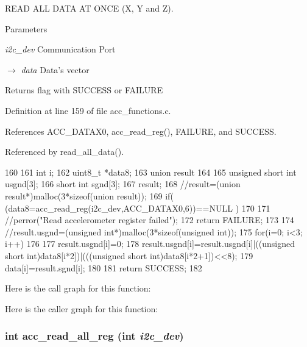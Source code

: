 READ ALL DATA AT ONCE (X, Y and Z). 


\begin{DoxyParams}{Parameters}
\item[{\em i2c\_\-dev}]Communication Port \item[\mbox{$\rightarrow$} {\em data}]Data's vector\end{DoxyParams}
\begin{DoxyReturn}{Returns}
flag with SUCCESS or FAILURE 
\end{DoxyReturn}


Definition at line 159 of file acc\_\-functions.c.



References ACC\_\-DATAX0, acc\_\-read\_\-reg(), FAILURE, and SUCCESS.



Referenced by read\_\-all\_\-data().




\begin{DoxyCode}
160 {
161   int i;
162   uint8_t *data8;
163   union result
164   {
165     unsigned short int usgnd[3];
166     short int sgnd[3];
167   } result;
168   //result=(union result*)malloc(3*sizeof(union result));
169   if( (data8=acc_read_reg(i2c_dev,ACC_DATAX0,6))==NULL )
170   {
171     //perror("Read accelerometer register failed");
172     return FAILURE;
173   }
174   //result.usgnd=(unsigned int*)malloc(3*sizeof(unsigned int));
175   for(i=0; i<3; i++)
176   {
177     result.usgnd[i]=0;
178     result.usgnd[i]=result.usgnd[i]|((unsigned short int)data8[i*2])|(((unsigned 
      short int)data8[i*2+1])<<8);
179     data[i]=result.sgnd[i];
180   }
181   return SUCCESS;  
182 }
\end{DoxyCode}




Here is the call graph for this function:



Here is the caller graph for this function:

\hypertarget{group__acc_ga8509cccabb08e7267677f66f25718731}{
\subsubsection[{acc\_\-read\_\-all\_\-reg}]{\setlength{\rightskip}{0pt plus 5cm}int acc\_\-read\_\-all\_\-reg (int {\em i2c\_\-dev})}}
\label{group__acc_ga8509cccabb08e7267677f66f25718731}


